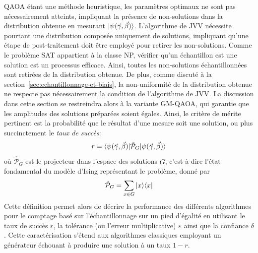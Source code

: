 QAOA étant une méthode heuristique, les paramètres optimaux ne sont pas nécessairement atteints, impliquant la présence de non-solutions dans la distribution obtenue en mesurant $\ket{\psi(\vec{\gamma}, \vec{\beta})}$. L'algorithme de JVV nécessite pourtant une distribution composée uniquement de solutions, impliquant qu'une étape de post-traitement doit être employé pour retirer les non-solutions. Comme le problème SAT appartient à la classe \textsf{NP}, vérifier qu'un échantillon est une solution est un processus efficace. Ainsi, toutes les non-solutions échantillonnées sont retirées de la distribution obtenue. De plus, comme discuté à la section~\ref{sec:echantillonnage-et-biais}, la non-uniformité de la distribution obtenue ne respecte pas nécessairement la condition de l'algorithme de JVV. La discussion dans cette section se restreindra alors à la variante GM-QAOA, qui garantie que les amplitudes des solutions préparées soient égales. Ainsi, le critère de mérite pertinent est la probabilité que le résultat d'une mesure soit une solution, ou plus succinctement le \textit{taux de succès}:
\begin{equation}
    r = \braket{ \psi(\vec{\gamma}, \vec{\beta}) | \hat{\mathcal{P}}_{G} | \psi(\vec{\gamma}, \vec{\beta}) }
\end{equation}
où $\hat{\mathcal{P}}_{G}$ est le projecteur dans l'espace des solutions $G$, c'est-à-dire l'état fondamental du modèle d'Ising représentant le problème, donné par
\begin{equation}
    \hat{\mathcal{P}}_{G} = \sum_{x \in G} \ket{x}\!\bra{x}
\end{equation}
Cette définition permet alors de décrire la performance des différents algorithmes pour le comptage basé sur l'échantillonnage sur un pied d'égalité en utilisant le taux de succès $r$, la tolérance (ou l'erreur multiplicative) $\varepsilon$ ainsi que la confiance $\delta$. Cette caractérisation s'étend aux algorithmes classiques employant un générateur échouant à produire une solution à un taux $1 - r$.

